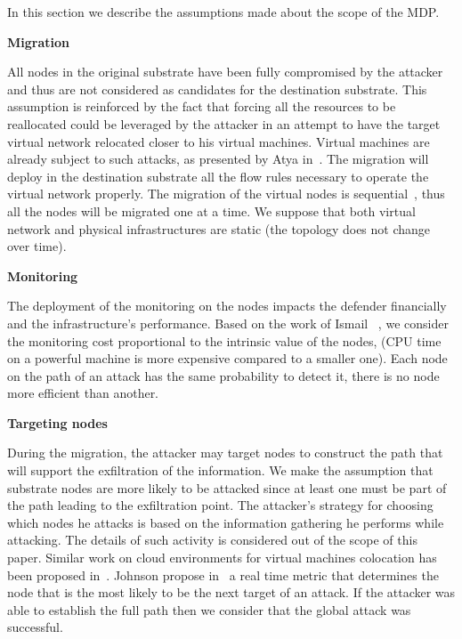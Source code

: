 \label{sec:hypotheses}
In this section we describe the assumptions made about the scope of the MDP.

\textbf{Migration}

All nodes in the original substrate have been fully compromised by the attacker and thus are not considered as candidates for the destination substrate.  
This assumption is reinforced by the fact that forcing all the resources to be reallocated could be leveraged by the attacker in an attempt to have the target virtual network relocated closer to his virtual machines.
Virtual machines are already subject to such attacks, as presented by Atya \etal in~\cite{stalling-atya2017,malicious-atya2017}.
The migration will deploy in the destination substrate all the flow rules necessary to operate the virtual network properly. The migration of the virtual nodes is sequential~\cite{Lime-Ghorbani2014}, thus all the nodes will be migrated one at a time.
We suppose that both virtual network and physical infrastructures are static (\ie the topology does not change over time).

\textbf{Monitoring}

The deployment of the monitoring on the nodes impacts the defender financially and the infrastructure's performance. Based on the work of Ismail \etal~\cite{interdep-ismail2017}, we consider the monitoring cost  proportional to the intrinsic value of the nodes, (\eg CPU time on a powerful machine is more expensive compared to a smaller one). 
Each node on the path of an attack has the same probability to detect it, \eg there is no node more efficient than another. 


\textbf{Targeting nodes}
\label{sec:attacking}

During the migration, the attacker may target nodes to construct the path that will support the exfiltration of the information.
We make the assumption that substrate nodes are more likely to be attacked since at least one must be part of the path leading to the exfiltration point.
The attacker's strategy for choosing which nodes he attacks is based on the information gathering he performs while attacking. The details of such activity is considered out of the scope of this paper.
Similar work on cloud environments for virtual machines colocation has been proposed in~\cite{getoffmucloud-Ristenpart2009, incentivemtd-Zhang2012}.
Johnson \etal propose in~\cite{mitigateAPT-johnson2013} a real time metric that determines the node that is the most likely to be the next target of an attack.
If the attacker was able to establish the full path then we consider that the global attack was successful.